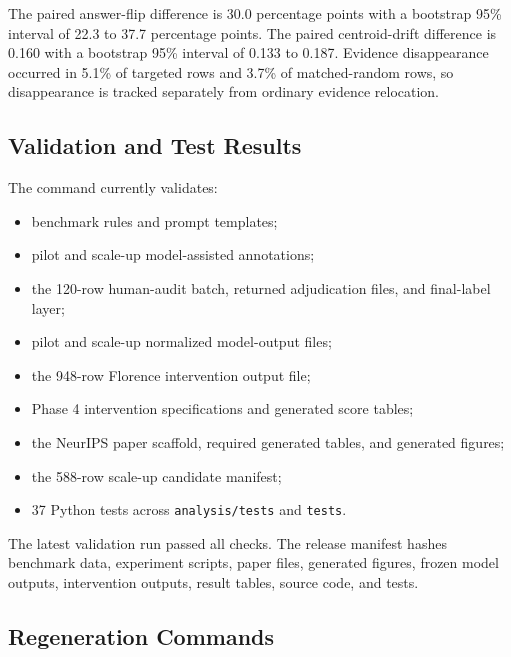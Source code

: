 \begin{table}[h]
\centering
\caption{Pilot Florence intervention effects.}

\end{table}

The paired answer-flip difference is 30.0 percentage points with a bootstrap 95\% interval of 22.3 to 37.7 percentage points. The paired centroid-drift difference is 0.160 with a bootstrap 95\% interval of 0.133 to 0.187. Evidence disappearance occurred in 5.1\% of targeted rows and 3.7\% of matched-random rows, so disappearance is tracked separately from ordinary evidence relocation.

\subsection{Validation and Test Results}

The command  currently validates:

\begin{itemize}
\item benchmark rules and prompt templates;
\item pilot and scale-up model-assisted annotations;
\item the 120-row human-audit batch, returned adjudication files, and final-label layer;
\item pilot and scale-up normalized model-output files;
\item the 948-row Florence intervention output file;
\item Phase 4 intervention specifications and generated score tables;
\item the NeurIPS paper scaffold, required generated tables, and generated figures;
\item the 588-row scale-up candidate manifest;
\item 37 Python tests across \texttt{analysis/tests} and \texttt{tests}.
\end{itemize}

The latest validation run passed all checks. The release manifest hashes benchmark data, experiment scripts, paper files, generated figures, frozen model outputs, intervention outputs, result tables, source code, and tests.

\subsection{Regeneration Commands}

